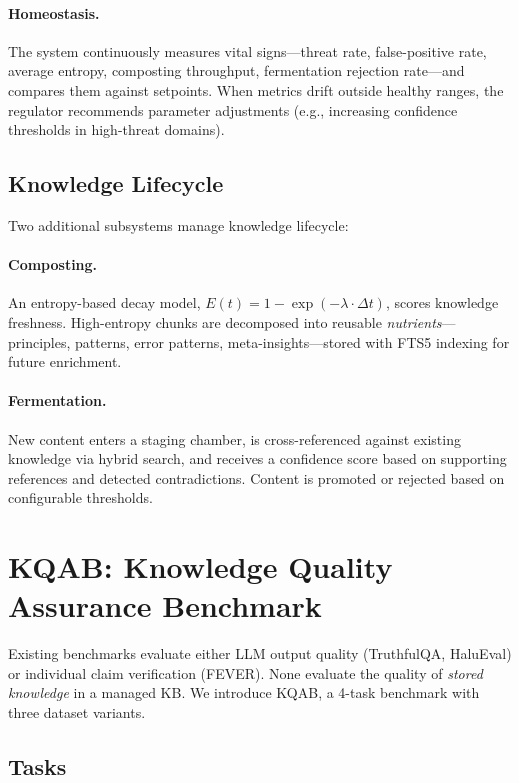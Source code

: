 \documentclass[11pt]{article}
\begin{document}
\paragraph{Homeostasis.} The system continuously measures vital signs---threat rate, false-positive rate, average entropy, composting throughput, fermentation rejection rate---and compares them against setpoints. When metrics drift outside healthy ranges, the regulator recommends parameter adjustments (e.g., increasing confidence thresholds in high-threat domains).

\subsection{Knowledge Lifecycle}
\label{sec:lifecycle}

Two additional subsystems manage knowledge lifecycle:

\paragraph{Composting.} An entropy-based decay model, $E(t) = 1 - \exp(-\lambda \cdot \Delta t)$, scores knowledge freshness. High-entropy chunks are decomposed into reusable \emph{nutrients}---principles, patterns, error patterns, meta-insights---stored with FTS5 indexing for future enrichment.

\paragraph{Fermentation.} New content enters a staging chamber, is cross-referenced against existing knowledge via hybrid search, and receives a confidence score based on supporting references and detected contradictions. Content is promoted or rejected based on configurable thresholds.

\section{KQAB: Knowledge Quality Assurance Benchmark}
\label{sec:kqab}

Existing benchmarks evaluate either LLM output quality (TruthfulQA, HaluEval) or individual claim verification (FEVER). None evaluate the quality of \emph{stored knowledge} in a managed KB. We introduce KQAB, a 4-task benchmark with three dataset variants.

\subsection{Tasks}
\end{document}
